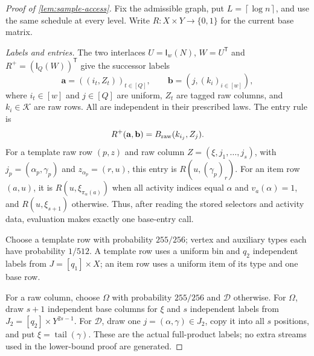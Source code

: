 \documentclass[11pt]{article} \usepackage[utf8]{inputenc}
\theoremstyle{plain} \newtheorem{theorem}{Theorem}[section]
\theoremstyle{definition} \newaliascnt{definition}{theorem}
\newcommand{\Int}[2]{\mathsf{I}_{#1}(#2)}
\newcommand{\ceil}[1]{\left\lceil#1\right\rceil}
\begin{document}
\begin{proof}[Proof of \cref{lem:sample-access}]
Fix the admissible graph, put $L=\ceil{\log n}$, and use the same schedule at
every level. Write $R:X\times Y\to\{0,1\}$ for the current base matrix.

\emph{Labels and entries.}
The two interlaces $U=\Int{w}{N}$, $W=U^{\mathsf T}$ and
$R^+=(\Int{Q}{W})^{\mathsf T}$ give the successor labels
\[
\mathbf a=((i_t,Z_t))_{t\in[Q]},\qquad
\mathbf b=(j,(k_i)_{i\in[w]}),
\]
where $i_t\in[w]$ and $j\in[Q]$ are uniform, $Z_t$ are tagged raw columns,
and $k_i\in\mathcal K$ are raw rows. All are independent in their prescribed
laws. The entry rule is
\[
R^+(\mathbf a,\mathbf b)=B_{\rm raw}(k_{i_j},Z_j).
\]
For a template raw row $(p,z)$ and raw column
$Z=(\xi,j_1,\ldots,j_s)$, with $j_p=(\alpha_p,\gamma_p)$ and
$z_{\alpha_p}=(r,u)$, this entry is $R(u,(\gamma_p)_r)$.
For an item row $(a,u)$, it is $R(u,\xi_{\pi_\alpha(a)})$ when all activity
indices equal $\alpha$ and $v_a(\alpha)=1$, and $R(u,\xi_{s+1})$ otherwise.
Thus, after reading the stored selectors and activity data, evaluation makes
exactly one base-entry call.

Choose a template row with probability $255/256$; vertex and auxiliary types
each have probability $1/512$. A template row uses a uniform bin and
$q_2$ independent labels from $J=[q_1]\times X$; an item row uses a uniform
item of its type and one base row.

For a raw column, choose $\Omega$ with probability $255/256$ and
$\mathcal D$ otherwise. For $\Omega$,
draw $s+1$ independent base columns for $\xi$ and $s$ independent labels
from $J_2=[q_2]\times Y^{2s-1}$. For $\mathcal D$, draw one
$j=(\alpha,\gamma)\in J_2$, copy it into all $s$ positions, and put
$\xi=\operatorname{tail}(\gamma)$. These are the actual full-product labels;
no extra streams used in the lower-bound proof are generated.


\end{proof}
\end{document}

